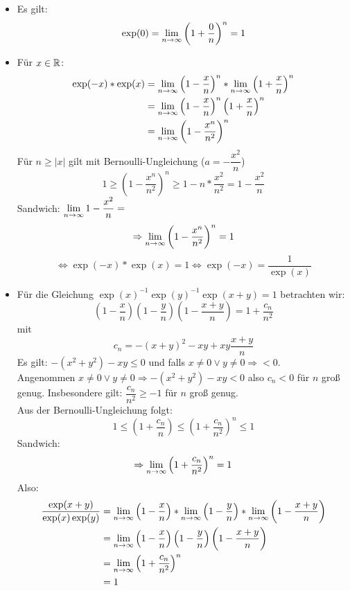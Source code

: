 \documentclass[main.tex]{subfiles}
\begin{document}
\begin{Beweis}[Konsequenzen]
  \begin{itemize}
    \item Es gilt:
      $$\exp(0) =\lim \limits_{n \to \infty} \left(1 + \dfrac{0}{n}\right)^n = 1$$
    \item Für $x \in \mathbb{R}$:
      $$\begin{aligned}
        \exp(-x)*\exp(x) &= \lim \limits_{n \to \infty} \left(1 - \dfrac{x}{n}\right)^n * \lim \limits_{n \to \infty} \left(1 + \dfrac{x}{n}\right)^n\\
        &= \lim \limits_{n \to \infty} \left(1 - \dfrac{x}{n}\right)^n \left(1 + \dfrac{x}{n}\right)^n\\
        &= \lim \limits_{n \to \infty} \left(1 - \dfrac{x^n}{n^2}\right)^n
      \end{aligned}$$
      Für $n \geq |x|$ gilt mit Bernoulli-Ungleichung ($a = -\dfrac{x^2}{n}$)
      $$1 \geq \left(1 - \dfrac{x^n}{n^2}\right)^n \geq 1 - n*\dfrac{x^2}{n^2} = 1 - \dfrac{x^2}{n}$$
      Sandwich: $\lim \limits_{n \to \infty} 1 - \dfrac{x^2}{n} = $
      $$ \Rightarrow \lim \limits_{n \to \infty} \left(1 - \dfrac{x^n}{n^2}\right)^n = 1$$
      $$\Leftrightarrow \exp(-x)*\exp(x) = 1 \Leftrightarrow \exp(-x) = \dfrac{1}{\exp(x)}$$
    \item Für die Gleichung $\exp(x)^{-1}\exp(y)^{-1}\exp(x + y) = 1$ betrachten wir:
      $$\left(1 - \dfrac{x}{n}\right)\left(1 - \dfrac{y}{n}\right)\left(1 - \dfrac{x+y}{n}\right) = 1 + \dfrac{c_n}{n^2}$$
      mit
      $$c_n = -(x+y)^2 - xy + xy \dfrac{x+y}{n}$$
      Es gilt: $-(x^2+y^2) - xy \leq 0$ und falls $x \neq 0 \lor y \neq 0 \Rightarrow < 0$.\\
      Angenommen $x \neq 0 \lor y \neq 0 \Rightarrow -(x^2+y^2) - xy < 0$ also $c_n < 0$ für $n$ groß genug. Insbesondere gilt: $\dfrac{c_n}{n^2} \geq -1$ für $n$ groß genug.\\
      Aus der Bernoulli-Ungleichung folgt:
      $$1 \leq \left(1+\dfrac{c_n}{n}\right) \leq \left(1+\dfrac{c_n}{n^2}\right)^n \leq 1$$
      Sandwich:
      $$\Rightarrow \lim \limits_{n \to \infty} \left(1+\dfrac{c_n}{n^2}\right)^n = 1$$
      Also:
      $$\begin{aligned}
        \dfrac{\exp(x+y)}{\exp(x)\exp(y)} &= \lim \limits_{n \to \infty} \left(1 - \dfrac{x}{n}\right)* \lim \limits_{n \to \infty} \left(1 - \dfrac{y}{n}\right)* \lim \limits_{n \to \infty} \left(1 - \dfrac{x+y}{n}\right)\\
        &= \lim \limits_{n \to \infty} \left(1 - \dfrac{x}{n}\right)\left(1 - \dfrac{y}{n}\right)\left(1 - \dfrac{x+y}{n}\right)\\
        &= \lim \limits_{n \to \infty} \left(1+\dfrac{c_n}{n^2}\right)^n\\
        &= 1
      \end{aligned}$$

\end{itemize}
\end{Beweis}
\end{document}
